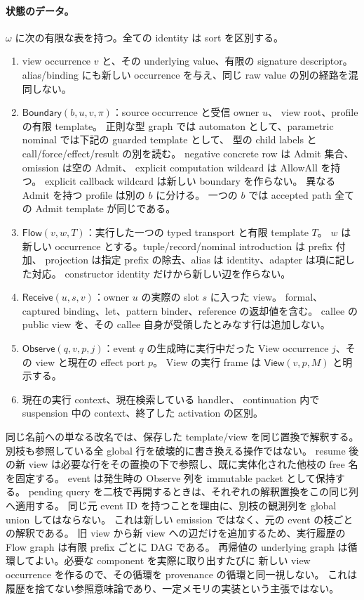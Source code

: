 \documentclass[11pt,a4paper]{article}
\begin{document}
\paragraph{状態のデータ。}
\(\omega\) に次の有限な表を持つ。全ての identity は sort を区別する。
\begin{enumerate}
\item view occurrence \(v\) と、その underlying value、有限の signature descriptor。
      alias/binding にも新しい occurrence を与え、同じ raw value の別の経路を混同しない。
\item \(\mathsf{Boundary}(b,u,v,\pi)\)：source occurrence と受信 owner \(u\)、
      view root、profile の有限 template。
      正則な型 graph では automaton として、parametric nominal では下記の guarded template として、
      型の child labels と call/force/effect/result の別を読む。
      negative concrete row は Admit 集合、omission は空の Admit、
      explicit computation wildcard は AllowAll を持つ。
      explicit callback wildcard は新しい boundary を作らない。
      異なる Admit を持つ profile は別の \(b\) に分ける。
      一つの \(b\) では accepted path 全ての Admit template が同じである。
\item \(\mathsf{Flow}(v,w,T)\)：実行した一つの typed transport と有限 template \(T\)。
      \(w\) は新しい occurrence とする。tuple/record/nominal introduction は prefix 付加、
      projection は指定 prefix の除去、alias は identity、adapter は項に記した対応。
      constructor identity だけから新しい辺を作らない。
\item \(\mathsf{Receive}(u,s,v)\)：owner \(u\) の実際の slot \(s\) に入った view。
      formal、captured binding、let、pattern binder、reference の返却値を含む。
      callee の public view を、その callee 自身が受領したとみなす行は追加しない。
\item \(\mathsf{Observe}(q,v,p,j)\)：event \(q\) の生成時に実行中だった
      View occurrence \(j\)、その view と現在の effect port \(p\)。
      View の実行 frame は \(\mathsf{View}(v,p,M)\) と明示する。
\item 現在の実行 context、現在検索している handler、
      continuation 内で suspension 中の context、終了した activation の区別。
\end{enumerate}
同じ名前への単なる改名では、保存した template/view を同じ置換で解釈する。
別枝も参照している全 global 行を破壊的に書き換える操作ではない。
resume 後の新 view は必要な行をその置換の下で参照し、既に実体化された他枝の free 名を固定する。
event は発生時の Observe 列を immutable packet として保持する。
pending query を二枝で再開するときは、それぞれの解釈置換をこの同じ列へ適用する。
同じ元 event ID を持つことを理由に、別枝の観測列を global union してはならない。
これは新しい emission ではなく、元の event の枝ごとの解釈である。
旧 view から新 view への辺だけを追加するため、実行履歴の Flow graph は有限 prefix ごとに DAG である。
再帰値の underlying graph は循環してよい。必要な component を実際に取り出すたびに
新しい view occurrence を作るので、その循環を provenance の循環と同一視しない。
これは履歴を捨てない参照意味論であり、一定メモリの実装という主張ではない。
\end{document}
